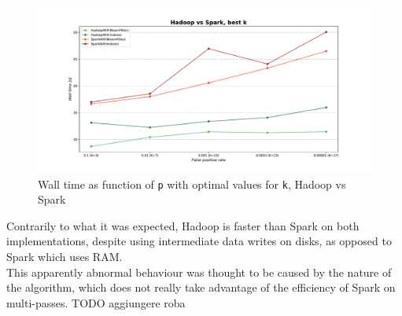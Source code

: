\begin{figure}[H]
    \begin{center}
        \includegraphics[scale=.45,trim={3cm 0 3cm 0},clip]{img/hadoopSpark_wallTimeP_bestK.pdf}
    \end{center}
    \vspace*{-0.5cm}
    \caption{Wall time as function of \texttt{p} with optimal values for \texttt{k}, Hadoop vs Spark}
    \label{fig:hadoopSpark_wallTimeP_bestK}
\end{figure}

Contrarily  to what it was expected, Hadoop is faster than Spark on both implementations, despite using intermediate data writes on disks, as opposed to Spark which uses RAM.\\
This apparently abnormal behaviour was thought to be caused by the nature of the algorithm, which does not really take advantage of the efficiency of Spark on multi-passes. TODO aggiungere roba